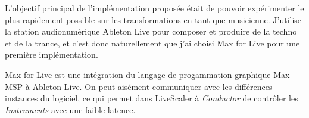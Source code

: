 L'objectif principal de l'implémentation proposée était de pouvoir expérimenter le plus rapidement possible sur les transformations en tant que musicienne. J'utilise la station audionumérique Ableton Live pour composer et produire de la techno et de la trance, et c'est donc naturellement que j'ai choisi Max for Live pour une première implémentation. 

Max for Live est une intégration du  langage de progammation graphique Max MSP à Ableton Live. On peut aisément communiquer avec les différences instances du logiciel, ce qui permet dans LiveScaler à \emph{Conductor} de contrôler les \emph{Instruments} avec une faible latence.





